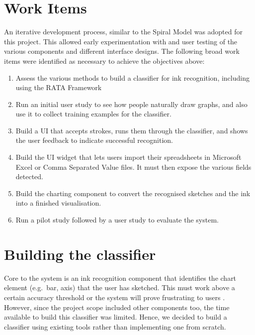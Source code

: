 	\section{Work Items}
	An iterative development process, similar to the Spiral Model was adopted for this project. This allowed early experimentation with and user testing of the various components and different interface designs. The following broad work items were identified as necessary to achieve the objectives above:
	\begin{enumerate}
		\item Assess the various methods to build a classifier for ink recognition, including using the RATA Framework
		\item Run an initial user study to  see how people naturally draw graphs, and also use it to collect training examples for the classifier.
		\item Build a UI that accepts strokes, runs them through the classifier, and shows the user feedback to indicate successful recognition.
		\item Build the UI widget that lets users import their spreadsheets in Microsoft Excel or Comma Separated Value files. It must then expose the various fields detected.
		\item Build the charting component to convert the recognised sketches and the ink into a finished visualisation.
		\item Run a pilot study followed by a user study to evaluate the system.
	\end{enumerate}
	
	\section{Building the classifier}	
	Core to the system is an ink recognition component that identifies the chart element (e.g.\ bar, axis) that the user has sketched. This must work above a certain accuracy threshold or the system will prove frustrating to users \citep{Frankish1995}. However, since the project scope included other components too, the time available to build this classifier was limited. Hence, we decided to build a classifier using existing tools rather than implementing one from scratch. 
	
